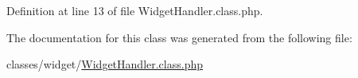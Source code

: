 Definition at line 13 of file Widget\+Handler.\+class.\+php.



The documentation for this class was generated from the following file\+:\begin{DoxyCompactItemize}
\item 
classes/widget/\hyperlink{WidgetHandler_8class_8php}{Widget\+Handler.\+class.\+php}\end{DoxyCompactItemize}
